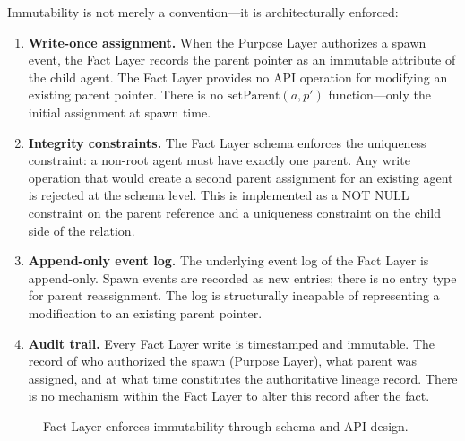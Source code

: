 Immutability is not merely a convention—it is architecturally enforced:

\begin{enumerate}
    \item \textbf{Write-once assignment.} When the Purpose Layer authorizes a spawn event, the Fact Layer records the parent pointer as an immutable attribute of the child agent. The Fact Layer provides no API operation for modifying an existing parent pointer. There is no $\text{setParent}(a, p')$ function—only the initial assignment at spawn time.
    
    \item \textbf{Integrity constraints.} The Fact Layer schema enforces the uniqueness constraint: a non-root agent must have exactly one parent. Any write operation that would create a second parent assignment for an existing agent is rejected at the schema level. This is implemented as a NOT NULL constraint on the parent reference and a uniqueness constraint on the child side of the relation.

    \item \textbf{Append-only event log.} The underlying event log of the Fact Layer is append-only. Spawn events are recorded as new entries; there is no entry type for parent reassignment. The log is structurally incapable of representing a modification to an existing parent pointer.

    \item \textbf{Audit trail.} Every Fact Layer write is timestamped and immutable. The record of who authorized the spawn (Purpose Layer), what parent was assigned, and at what time constitutes the authoritative lineage record. There is no mechanism within the Fact Layer to alter this record after the fact.
\end{enumerate}

\begin{figure}[tb]
\centering
{}
\caption{Fact Layer enforces immutability through schema and API design.}
\label{fig:fact-layer-immutability}
\end{figure}

